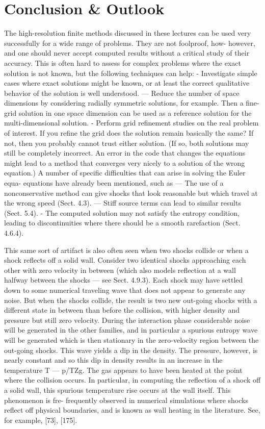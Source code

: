 \section{Conclusion \& Outlook}

The high-resolution finite methods discussed in these lectures can be used
very successfully for a wide range of problems. They are not foolproof, how-
however, and one should never accept computed results without a critical study
of their accuracy. This is often hard to assess for complex problems where
the exact solution is not known, but the following techniques can help:
- Investigate simple cases where exact solutions might be known, or at least
the correct qualitative behavior of the solution is well understood.
— Reduce the number of space dimensions by considering radially symmetric
solutions, for example. Then a fine-grid solution in one space dimension
can be used as a reference solution for the multi-dimensional solution.
- Perform grid refinement studies on the real problem of interest. If you
refine the grid does the solution remain basically the same? If not, then
you probably cannot trust either solution. (If so, both solutions may still
be completely incorrect. An error in the code that changes the equations
might lead to a method that converges very nicely to a solution of the
wrong equation.)
A number of specific difficulties that can arise in solving the Euler equa-
equations have already been mentioned, such as
— The use of a nonconservative method can give shocks that look reasonable
but which travel at the wrong speed (Sect. 4.3).
— Stiff source terms can lead to similar results (Sect. 5.4).
- The computed solution may not satisfy the entropy condition, leading to
discontinuities where there should be a smooth rarefaction (Sect. 4.6.4).

This same sort of artifact is also often seen when two shocks collide or when a
shock reflects off a solid wall. Consider two identical shocks approaching each
other with zero velocity in between (which also models reflection at a wall
halfway between the shocks — see Sect. 4.9.3). Each shock may have settled
down to some numerical traveling wave that does not appear to generate any
noise. But when the shocks collide, the result is two new out-going shocks
with a different state in between than before the collision, with higher density
and pressure but still zero velocity. During the interaction phase considerable
noise will be generated in the other families, and in particular a spurious
entropy wave will be generated which is then stationary in the zero-velocity
region between the out-going shocks. This wave yields a dip in the density.
The pressure, however, is nearly constant and so this dip in density results
in an increase in the temperature T — p/TZg. The gas appears to have been
heated at the point where the collision occurs.
In particular, in computing the reflection of a shock off a solid wall, this
spurious temperature rise occurs at the wall itself. This phenomenon is fre-
frequently observed in numerical simulations where shocks reflect off physical
boundaries, and is known as wall heating in the literature. See, for example,
[73], [175].


